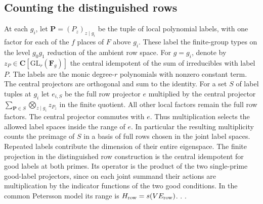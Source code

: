 \subsection{Counting the distinguished rows}
\leavevmode{}%
At each \(g_i\), let \(\boldsymbol{P}=(P_z)_{z\mid g_i}\) be the tuple of
local polynomial labels, with one factor for each of the \(f\) places
of \(F\) above \(g_i\). These label the finite-group types on the level
\(g_0g_1\) reduction of the ambient row space. For
\(g=g_i\), denote by \(z_P\in\mathbf C[\mathrm{GL}_r(\mathbf F_g)]\)
the central idempotent of the sum of irreducibles with label \(P\).
The labels are the monic degree-\(r\) polynomials with nonzero constant
term. The central projectors are orthogonal and sum to the identity.
For a set \(S\) of label tuples at \(g_i\) let \(e_{i,S}\) be the full
row projector \(e\) multiplied by the central projector
\(\sum_{\boldsymbol{P}\in S}\bigotimes_{z\mid g_i}z_{P_z}\) in the finite
quotient. All other local factors remain the full row factors. The
central projector commutes with \(e\). Thus multiplication selects
the allowed label spaces inside the range of \(e\). In particular
the resulting multiplicity counts the preimage of \(S\) in a basis
of full rows chosen in the joint label spaces. Repeated labels contribute
the dimension of their entire eigenspace. The finite projection in
the distinguished row construction is the central idempotent for
good labels at both primes. Its operator is the product of the
two single-prime good-label projectors, since on each joint
summand their actions are multiplication by the indicator functions
of the two good conditions. In the common Petersson model its
range is \(H_{\rm row}=s(VE_{\rm row})\).
.
.

